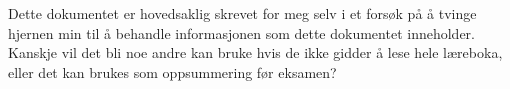 Dette dokumentet er hovedsaklig skrevet for meg selv i et forsøk på å tvinge hjernen min til å behandle informasjonen som dette dokumentet inneholder.
Kanskje vil det bli noe andre kan bruke hvis de ikke gidder å lese hele læreboka, eller det kan brukes som oppsummering før eksamen?
